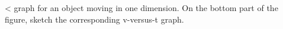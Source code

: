 <%
graph for an object moving in one dimension.  On the bottom
part of the figure, sketch the corresponding v-versus-t graph.
